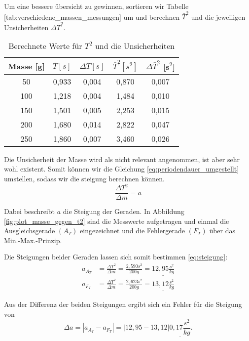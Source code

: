 Um eine bessere übersicht zu gewinnen, sortieren wir Tabelle \ref{tab:verschiedene_massen_messungen} um und berechnen $\bar{T}^2$ und die jeweiligen Unsicherheiten $\Delta \bar{T}^2$.
\begin{table}[h!]
    \centering
    \begin{tabular}{c | c | c | c | c}
    Masse [g] & $\bar{T} [s]$  & $\Delta \bar{T} [s]$ & $\bar{T}^2 [s^2]$ & $\Delta \bar{T}^2$ [s$^2$] \\
    \hline
    50  & 0,933 & 0,004 & 0,870 & 0,007\\
    100 & 1,218 & 0,004 & 1,484 & 0,010\\
    150 & 1,501 & 0,005 & 2,253 & 0,015\\
    200 & 1,680 & 0,014 & 2,822 & 0,047\\
    250 & 1,860 & 0,007 & 3,460 & 0,026\\
    \hline
    \end{tabular}
    \caption{Berechnete Werte für $T^2$ und die Unsicherheiten}
    \label{tab:berechnete_werte}
\end{table}

Die Unsicherheit der Masse wird als nicht relevant angenommen, ist aber sehr wohl existent.
Somit können wir die Gleichung \eqref{eq:periodendauer_umgestellt} umstellen, sodass wir die steigung berechnen können.
\begin{equation}
    \frac{\Delta T^2}{\Delta m} = a
    \label{eq:steigung}
\end{equation}

Dabei beschreibt $a$ die Steigung der Geraden. In Abbildung \ref{fig:plot_masse_gegen_t2} sind die Messwerte aufgetragen und einmal die Ausgleichsgerade $(A_T)$ eingezeichnet und die Fehlergerade $(F_T)$ über das Min.-Max.-Prinzip.


Die Steigungen beider Geraden lassen sich somit bestimmen \eqref{eq:steigung}:
\begin{align}
    a_{A_T} &= \frac{\Delta T^2}{\Delta m} = \frac{2,590 s^2}{200 g} =\underline{12,95 \frac{s^2}{kg}} \\
    a_{F_T} &= \frac{\Delta T^2}{\Delta m} = \frac{2,623 s^2}{200 g} =\underline{13,12 \frac{s^2}{kg}}
\end{align}

Aus der Differenz der beiden Steigungen ergibt sich ein Fehler für die Steigung von
\begin{equation}
    \Delta a = |a_{A_T} - a_{F_T}| = |12,95 - 13,12| \underline{0,17 \frac{s^2}{kg}}.
\end{equation}

